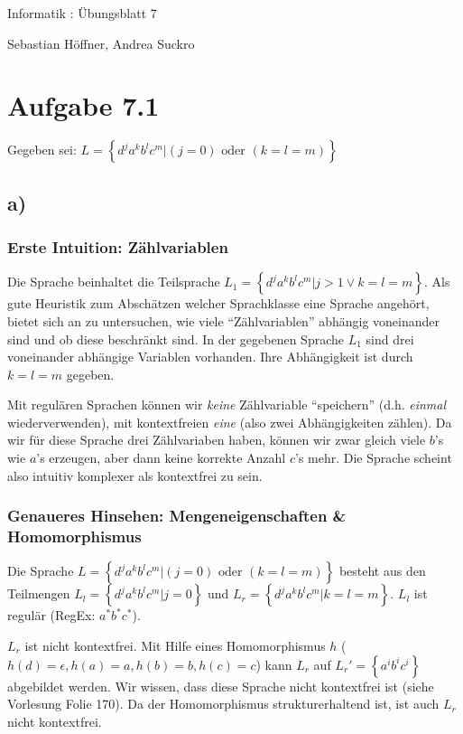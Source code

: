 \documentclass{article}
\begin{document}
\begin{center}
  \Large{Informatik \revD: Übungsblatt 7}

  \large{Sebastian Höffner, Andrea Suckro}
\end{center}



\section*{Aufgabe 7.1}
Gegeben sei: $L=\left\{d^ja^kb^lc^m | (j=0)\text{ oder }(k=l=m) \right\}$

\subsection*{a)}
\subsubsection*{Erste Intuition: Zählvariablen}
Die Sprache beinhaltet die Teilsprache $L_1=\left\{d^ja^kb^lc^m | j>1 \vee k=l=m \right\}$. Als gute Heuristik zum Abschätzen welcher Sprachklasse eine Sprache angehört, bietet sich an zu untersuchen, wie viele "`Zählvariablen"' abhängig voneinander sind und ob diese beschränkt sind. In der gegebenen Sprache $L_1$ sind drei voneinander abhängige Variablen vorhanden. Ihre Abhängigkeit ist durch $k=l=m$ gegeben. 

Mit regulären Sprachen können wir \emph{keine} Zählvariable "`speichern"' (d.h. \emph{einmal} wiederverwenden), mit kontextfreien \emph{eine} (also zwei Abhängigkeiten zählen). Da wir für diese Sprache drei Zählvariaben haben, können wir zwar gleich viele $b$'s wie $a$'s erzeugen, aber dann keine korrekte Anzahl $c$'s mehr. Die Sprache scheint also intuitiv komplexer als kontextfrei zu sein.

\subsubsection*{Genaueres Hinsehen: Mengeneigenschaften \& Homomorphismus}
Die Sprache $L=\left\{d^ja^kb^lc^m | (j=0)\text{ oder }(k=l=m) \right\}$ besteht aus den Teilmengen $L_l=\left\{d^ja^kb^lc^m | j=0\right\}$ und $L_r=\left\{d^ja^kb^lc^m | k=l=m\right\}$. $L_l$ ist regulär (RegEx: $a^*b^*c^*$). 

$L_r$ ist nicht kontextfrei. Mit Hilfe eines Homomorphismus $h$ ($h(d)=\epsilon, h(a)=a, h(b)=b, h(c)=c$) kann $L_r$ auf $L_r'=\left\{a^ib^ic^i\right\}$ abgebildet werden. Wir wissen, dass diese Sprache nicht kontextfrei ist (siehe Vorlesung Folie 170). Da der Homomorphismus strukturerhaltend ist, ist auch $L_r$ nicht kontextfrei.
\end{document}

